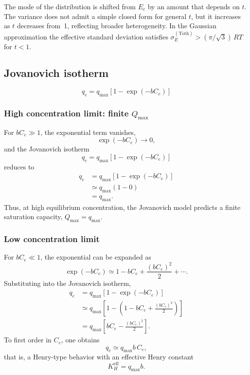 	The mode of the distribution is shifted from $E_c$ by an amount that
	depends on $t$. The variance does not admit a simple closed form for
	general $t$, but it increases as $t$ decreases from~1, reflecting
	broader heterogeneity. In the Gaussian approximation the effective
	standard deviation satisfies
	$\sigma_E^{\mathrm{(T\acute{o}th)}} > (\pi/\sqrt{3})\,RT$ for
	$t < 1$.


	\subsection{Jovanovich isotherm}
	\[
	q_e = q_{\max} \left[1 - \exp(-b C_e)\right]
	\]
	
	\subsubsection{High concentration limit: finite $Q_{\max}$}
	
	For $b C_e \gg 1$, the exponential term vanishes,
	\[
	\exp(-b C_e) \to 0,
	\]
	and the Jovanovich isotherm
	\[
	q_e = q_{\max} \left[1 - \exp(-b C_e)\right]
	\]
	reduces to
	\begin{align}
		q_e 
		&= q_{\max} \left[1 - \exp(-b C_e)\right] \nonumber \\
		&\simeq q_{\max} (1 - 0) \nonumber \\
		&= q_{\max}.
	\end{align}
	Thus, at high equilibrium concentration, the Jovanovich model predicts a finite saturation capacity, $Q_{\max} = q_{\max}$.
	
	\subsubsection{Low concentration limit}
	
	For $b C_e \ll 1$, the exponential can be expanded as
	\[
	\exp(-b C_e) \simeq 1 - b C_e + \frac{(b C_e)^2}{2} + \cdots.
	\]
	Substituting into the Jovanovich isotherm,
	\begin{align}
		q_e
		&= q_{\max} \left[1 - \exp(-b C_e)\right] \nonumber \\
		&\simeq q_{\max} \left[1 - \left(1 - b C_e + \frac{(b C_e)^2}{2}\right)\right] \nonumber \\
		&= q_{\max} \left[b C_e - \frac{(b C_e)^2}{2}\right].
	\end{align}
	To first order in $C_e$, one obtains
	\begin{equation}
		q_e \simeq q_{\max} b\, C_e,
	\end{equation}
	that is, a Henry-type behavior with an effective Henry constant
	\begin{equation}
		K_H^{\mathrm{eff}} = q_{\max} b.
	\end{equation}

